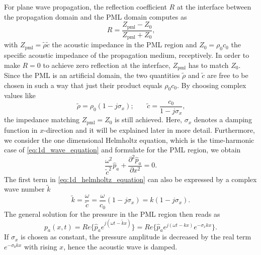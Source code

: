 For plane wave propagation, the reflection coefficient $R$ at the interface between the propagation domain and the PML domain computes as
\begin{equation}
	R = \frac{Z_{\text{pml}} - Z_{\text{0}}}{Z_{\text{pml}} + Z_{\text{0}}}\text{,} \label{eq:reflection_coefficient_PML}
\end{equation}
with $Z_{\text{pml}} = \tilde{\rho}\tilde{c}$ the acoustic impedance in the PML region and $Z_{\text{0}} = \rho_0 c_0$ the specific acoustic impedance of the propagation medium, receptively. In order to make $R = 0$ to achieve zero reflection at the interface, $Z_{\text{pml}}$ has to match $Z_{\text{0}}$. Since the PML is an artificial domain, the two quantities $\tilde{\rho}$ and $\tilde{c}$ are free to be chosen in such a way that just their product equals $\rho_0 c_0$. By choosing complex values like
\begin{equation}
	\tilde{\rho} = \rho_0(1 - j\sigma_x)\text{;}\qquad \tilde{c} = \frac{c_0}{1- j\sigma_x}\text{,}
\end{equation}
the impedance matching $Z_{\text{pml}} = Z_{\text{0}}$ is still achieved. Here, $\sigma_x$ denotes a damping function in $x$-direction and it will be explained later in more detail. Furthermore, we consider the one dimensional Helmholtz equation, which is the time-harmonic case of \cref{eq:1d_wave_equation} and formulate for the PML region, we obtain
\begin{equation}
	\frac{\omega^2}{\tilde{c}^2}\hat{p}_a  +
	\frac{\partial^2 \hat{p}_a}{\partial x^2} = 0 \text{.} \label{eq:1d_helmholtz_equation}
\end{equation}
The first term in \cref{eq:1d_helmholtz_equation} can also be expressed by a complex wave number $\tilde{k}$
\begin{equation}
	\tilde{k} = \frac{\omega}{\tilde{c}} = \frac{\omega}{c_0}(1- j\sigma_x) = k(1-j\sigma_x)\text{.}
\end{equation}
The general solution for the pressure in the PML region then reads as
\begin{equation}
	p_a(x,t) = Re\lbrace\hat{p}_a e^{j(\omega t - \tilde{k}x)}\rbrace = Re\lbrace\hat{p}_a e^{j(\omega t - kx)} e^{-\sigma_x kx}\rbrace \text{.} \label{eq:noname_3}
\end{equation}
If $\sigma_x$ is chosen as constant, the pressure amplitude is decreased by the real term $e^{-\sigma_0 kx}$ with rising $x$, hence the acoustic wave is damped.

